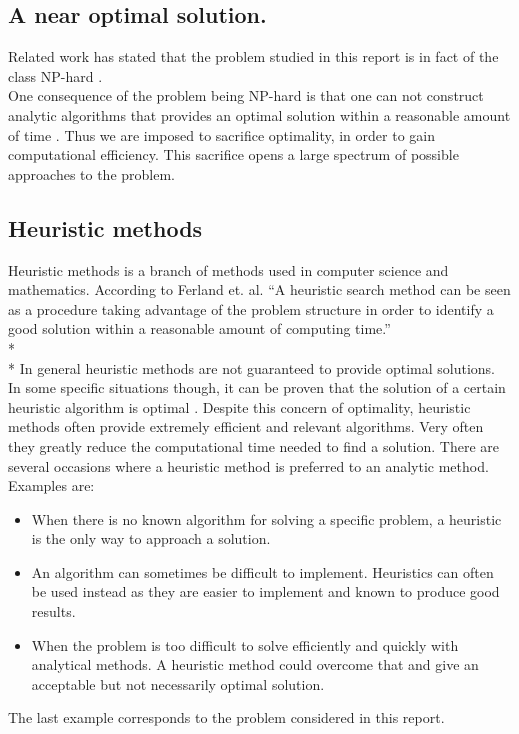 \subsection{A near optimal solution.}
Related work has stated that the problem studied in this report is in fact of the class NP-hard \cite{paper1}.\\ %
One consequence of the problem being NP-hard is that one can not construct analytic algorithms that provides an optimal solution within a reasonable amount of time \cite{adk19}. Thus we are imposed to sacrifice optimality, in order to gain computational efficiency. This sacrifice opens a large spectrum of possible approaches to the problem.
\subsection{Heuristic methods}
Heuristic methods is a branch of methods used in computer science and mathematics. According to Ferland et. al. \cite{heuristics} ``A heuristic search method can be seen as a procedure taking advantage of the problem structure in order to identify a good solution within a reasonable amount of computing time.''\\*%
\\*
In general heuristic methods are not guaranteed to provide optimal solutions. In some specific situations though, it can be proven that the solution of a certain heuristic algorithm is optimal%
. Despite this concern of optimality, heuristic methods often provide extremely efficient and relevant algorithms. Very often they greatly reduce the computational time needed to find a solution. There are several occasions where a heuristic method is preferred to an analytic method. Examples are:
\begin{itemize}
\item When there is no known algorithm for solving a specific problem, a heuristic is the only way to approach a solution.
\item An algorithm can sometimes be difficult to implement. Heuristics can often be used instead as they are easier to implement and known to produce good results.
\item When the problem is too difficult to solve efficiently and quickly with analytical methods. A heuristic method could overcome that and give an acceptable but not necessarily optimal solution.
\end{itemize}

The last example corresponds to the problem considered in this report.
